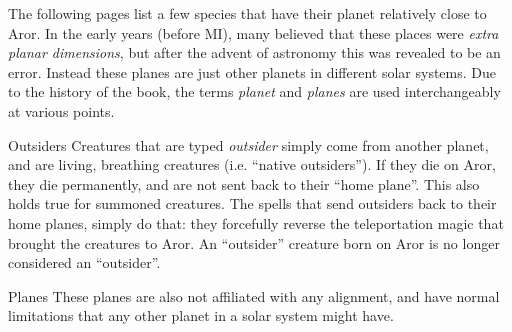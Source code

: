 The following pages list a few species that have their planet relatively close
to Aror. In the early years (before MI), many believed that these places were
\emph{extra planar dimensions}, but after the advent of astronomy this was
revealed to be an error. Instead these planes are just other planets in
different solar systems. Due to the history of the book, the terms
\emph{planet} and \emph{planes} are used interchangeably at various points.

\begin{35e}{Outsiders}
  Creatures that are typed \emph{outsider} simply come from another planet,
  and are living, breathing creatures (i.e. ``native outsiders''). If they die
  on Aror, they die permanently, and are not sent back to their ``home
  plane''. This also holds true for summoned creatures. The spells that send
  outsiders back to their home planes, simply do that: they forcefully reverse
  the teleportation magic that brought the creatures to Aror. An ``outsider''
  creature born on Aror is no longer considered an ``outsider''.
\end{35e}

\begin{35e}{Planes}
  These planes are also not affiliated with any alignment, and have normal
  limitations that any other planet in a solar system might have.
\end{35e}






